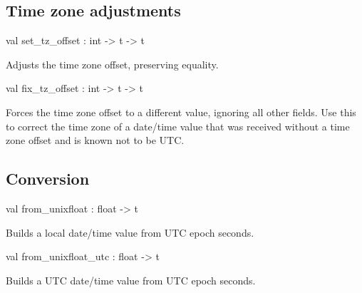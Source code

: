 \documentclass[11pt]{article}
\begin{document}
\subsection{Time zone adjustments}




\label{val:XmlRpcDateTime.set-underscoretz-underscoreoffset}\begin{ocamldoccode}
val set_tz_offset : int -> t -> t
\end{ocamldoccode}
\begin{ocamldocdescription}
Adjusts the time zone offset, preserving equality.


\end{ocamldocdescription}




\label{val:XmlRpcDateTime.fix-underscoretz-underscoreoffset}\begin{ocamldoccode}
val fix_tz_offset : int -> t -> t
\end{ocamldoccode}
\begin{ocamldocdescription}
Forces the time zone offset to a different value, ignoring all other
    fields. Use this to correct the time zone of a date/time value that
    was received without a time zone offset and is known not to be UTC.


\end{ocamldocdescription}




\subsection{Conversion}




\label{val:XmlRpcDateTime.from-underscoreunixfloat}\begin{ocamldoccode}
val from_unixfloat : float -> t
\end{ocamldoccode}
\begin{ocamldocdescription}
Builds a local date/time value from UTC epoch seconds.


\end{ocamldocdescription}




\label{val:XmlRpcDateTime.from-underscoreunixfloat-underscoreutc}\begin{ocamldoccode}
val from_unixfloat_utc : float -> t
\end{ocamldoccode}
\begin{ocamldocdescription}
Builds a UTC date/time value from UTC epoch seconds.


\end{ocamldocdescription}
\end{document}
